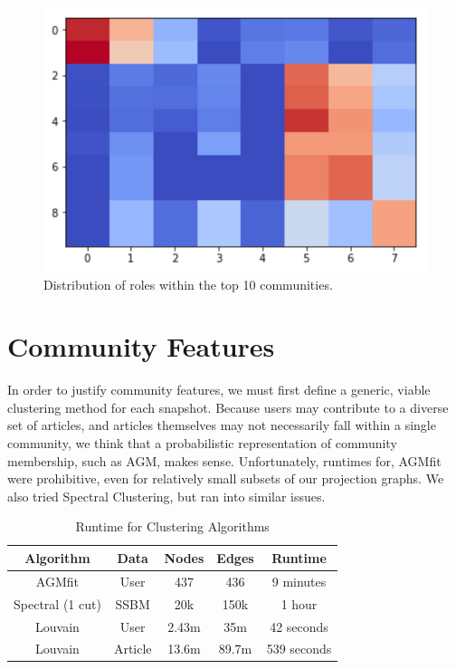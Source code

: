 \documentclass[letterpaper, 12pt, conference]{ieeeconf}
\begin{document}
\begin{figure}
    \centering
    \includegraphics[width=0.75\linewidth]{top10-community-roles.png}
    \caption{Distribution of roles within the top 10 communities.}
    \label{fig:top_roles}
\end{figure}

\section{Community Features}

In order to justify community features, we must first define a generic, viable clustering method for each snapshot. Because users may contribute to a diverse set of articles, and articles themselves may not necessarily fall within a single community, we think that a probabilistic representation of community membership, such as AGM, makes sense. Unfortunately, runtimes for, AGMfit\cite{leskovec2016snap} were prohibitive, even for relatively small subsets of our projection graphs. We also tried Spectral Clustering, but ran into similar issues.

\begin{table}[ht]
    \centering
    \begin{tabular}{c|c|c|c|c}
    \toprule
        Algorithm & Data & Nodes & Edges & Runtime \\
         \midrule
        AGMfit & User & 437 & 436 & 9 minutes \\
        Spectral (1 cut) & SSBM & 20k & 150k & 1 hour \\
        Louvain & User & 2.43m & 35m & 42 seconds \\
        Louvain & Article & 13.6m & 89.7m & 539 seconds \\
         \bottomrule
    \end{tabular}
    \caption{Runtime for Clustering Algorithms}
    \label{tab:clustering_runtime}
\end{table}
\end{document}

